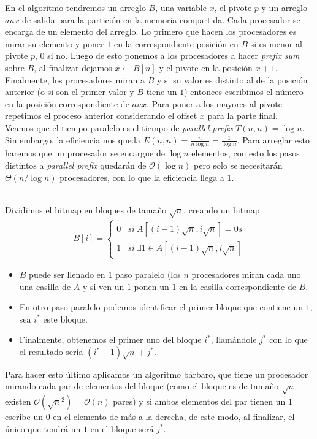 \documentclass[dcc,uchile]{fcfmcourse}
\theoremstyle{plain}
\theoremstyle{definition}
\begin{document}
\begin{problems}
En el algoritmo tendremos un arreglo $B$,  una variable $x$, el pivote $p$ y un arreglo $aux$ de salida para la partición en la memoria compartida. Cada procesador se encarga de un elemento del arreglo. Lo primero que hacen los procesadores es mirar su elemento y poner $1$ en la correspondiente posición en $B$ si es menor al pivote $p$, $0$ si no. Luego de esto ponemos a los procesadores a hacer \textit{prefix sum} sobre $B$, al finalizar dejamos $x\gets B[n]$ y el pivote en la posición $x+1$. Finalmente, los procesadores miran a $B$ y si su valor es distinto al de la posición anterior (o si son el primer valor y $B$ tiene un $1$) entonces escribimos el número en la posición correspondiente de $aux$. Para poner a los mayores al pivote repetimos el proceso anterior considerando el offset $x$ para la parte final.\\

Veamos que el tiempo paralelo es el tiempo de \textit{parallel prefix} $T(n,n) = \log{n}$. Sin embargo, la eficiencia nos queda $E(n,n) = \frac{n}{n\log{n}} = \frac{1}{\log{n}}$. Para arreglar esto haremos que un procesador se encargue de $\log{n}$ elementos, con esto los pasos distintos a \textit{parallel prefix} quedarán de $\mathcal{O}(\log{n})$ pero solo se necesitarán $\Theta(n/\log{n})$ procesadores, con lo que la eficiencia llega a $1$.

\\
Dividimos el bitmap en bloques de tamaño $\sqrt{n}$, creando un bitmap
\begin{align*}
    B[i] = \begin{cases} 
      0 & si\ A[(i-1)\sqrt{n}, i\sqrt{n}] = 0s \\
      1 & si\ \exists 1 \in A[(i-1)\sqrt{n}, i\sqrt{n}] 
   \end{cases}
\end{align*}
\begin{itemize}
    \item $B$ puede ser llenado en $1$ paso paralelo (los $n$ procesadores miran cada uno una casilla de $A$ y si ven un $1$ ponen un $1$ en la casilla correspondiente de $B$.
    \item En otro paso paralelo podemos identificar el primer bloque que contiene un $1$, sea $i^*$ este bloque.
    \item Finalmente, obtenemos el primer uno del bloque $i^*$, llamándole $j^*$ con lo que el resultado sería $(i^*-1)\sqrt{n}+j^*$.
\end{itemize}
Para hacer esto último aplicamos un algoritmo bárbaro, que tiene un procesador mirando cada par de elementos del bloque (como el bloque es de tamaño $\sqrt{n}$ existen $\mathcal{O}(\sqrt{n}^2) = \mathcal{O}(n)$ pares) y si ambos elementos del par tienen un $1$ escribe un $0$ en el elemento de más a la derecha, de este modo, al finalizar, el único que tendrá un $1$ en el bloque será $j^*$.
\end{problems}
\end{document}
